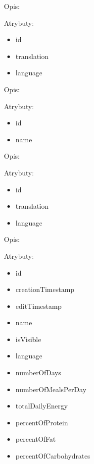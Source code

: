 \begin{enumerate}[label={\textbf{KAT/\protect\threedigits{\theenumi}}}, wide, labelwidth=!, labelindent=0pt, series=reqs]
     \label{kat:DishTypeTranslation}

    Opis: \lipsum[1]
    \par
    Atrybuty:
    \begin{itemize}
        \item id
        \item translation
        \item language
    \end{itemize}

     \label{kat:MealType}

    Opis: \lipsum[1]
    \par
    Atrybuty:
    \begin{itemize}
        \item id
        \item name
    \end{itemize}

     \label{kat:MealTypeTranslation}

    Opis: \lipsum[1]
    \par
    Atrybuty:
    \begin{itemize}
        \item id
        \item translation
        \item language
    \end{itemize}


     \label{kat:MealPlan}

    Opis: \lipsum[1]
    \par
    Atrybuty:
    \begin{itemize}
        \item id
        \item creationTimestamp
        \item editTimestamp
        \item name
        \item isVisible
        \item language
        \item numberOfDays
        \item numberOfMealsPerDay
        \item totalDailyEnergy
        \item percentOfProtein
        \item percentOfFat
        \item percentOfCarbohydrates
    \end{itemize}


\end{enumerate}
